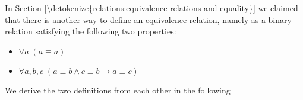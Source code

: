 \documentclass[letterpaper,10pt,english]{sphinxmanual}
\begin{document}
\sphinxAtStartPar
In \hyperref[\detokenize{relations:equivalence-relations-and-equality}]{Section \ref{\detokenize{relations:equivalence-relations-and-equality}}} we claimed that there is
another way to define an equivalence relation,
namely as a binary relation satisfying the following two properties:
\begin{itemize}
\item {} 
\sphinxAtStartPar
\(\forall a \; (a \equiv a)\)

\item {} 
\sphinxAtStartPar
\(\forall {a, b, c} \; (a \equiv b \wedge c \equiv b \to a \equiv c)\)

\end{itemize}

\sphinxAtStartPar
We derive the two definitions from each other in the following
\end{document}
